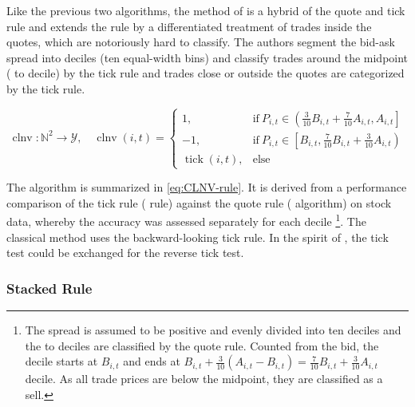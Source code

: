Like the previous two algorithms, the  method of \textcite[][3809]{chakrabartyTradeClassificationAlgorithms2012} is a hybrid of the quote and tick rule and extends the  rule by a differentiated treatment of trades inside the quotes, which are notoriously hard to classify. The authors segment the bid-ask spread into deciles (ten equal-width bins) and classify trades around the midpoint ( to  decile) by the tick rule and trades close or outside the quotes are categorized by the tick rule.

\begin{equation}
    \operatorname{clnv} \colon \mathbb{N}^2 \to \mathcal{Y}, \quad
    \operatorname{clnv}(i, t)=
    \begin{cases}
        1,                         & \text{if}\ P_{i, t} \in \left(\frac{3}{10} B_{i,t} + \frac{7}{10} A_{i,t}, A_{i, t}\right] \\
        -1,                        & \text{if}\ P_{i, t} \in \left[ B_{i,t}, \frac{7}{10} B_{i,t} + \frac{3}{10} A_{i,t}\right) \\
        \operatorname{tick}(i, t), & \text{else}
    \end{cases}
    \label{eq:CLNV-rule}
\end{equation}


The algorithm is summarized in \cref{eq:CLNV-rule}. It is derived from a performance comparison of the tick rule ( rule) against the quote rule ( algorithm) on stock data, whereby the accuracy was assessed separately for each decile \footnote{The spread is assumed to be positive and evenly divided into ten deciles and the  to  deciles are classified by the quote rule. Counted from the bid, the  decile starts at $B_{i,t}$ and ends at $B_{i,t} + \tfrac{3}{10} (A_{i,t} - B_{i,t}) = \tfrac{7}{10} B_{i,t} + \tfrac{3}{10} A_{i,t}$  decile. As all trade prices are below the midpoint, they are classified as a sell.}. The classical  method uses the backward-looking tick rule. In the spirit of \textcite[][735]{leeInferringTradeDirection1991}, the tick test could be exchanged for the reverse tick test.

\subsubsection{Stacked Rule}\label{sec:stacked-rule}


